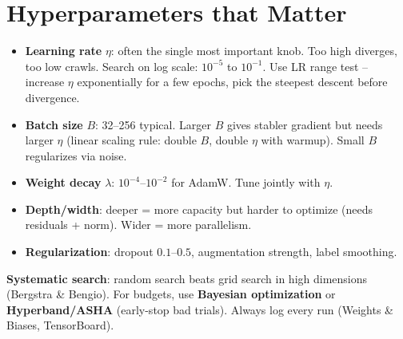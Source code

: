 \section{Hyperparameters that Matter}
\begin{itemize}
\item \textbf{Learning rate} $\eta$: often the single most important knob. Too high diverges, too low crawls. Search on log scale: $10^{-5}$ to $10^{-1}$. Use LR range test -- increase $\eta$ exponentially for a few epochs, pick the steepest descent before divergence.
\item \textbf{Batch size} $B$: 32--256 typical. Larger $B$ gives stabler gradient but needs larger $\eta$ (linear scaling rule: double $B$, double $\eta$ with warmup). Small $B$ regularizes via noise.
\item \textbf{Weight decay} $\lambda$: $10^{-4}$--$10^{-2}$ for AdamW. Tune jointly with $\eta$.
\item \textbf{Depth/width}: deeper = more capacity but harder to optimize (needs residuals + norm). Wider = more parallelism.
\item \textbf{Regularization}: dropout $0.1$--$0.5$, augmentation strength, label smoothing.
\end{itemize}

\begin{center}
\end{center}

\textbf{Systematic search}: random search beats grid search in high dimensions (Bergstra \& Bengio). For budgets, use \textbf{Bayesian optimization} or \textbf{Hyperband/ASHA} (early-stop bad trials). Always log every run (Weights \& Biases, TensorBoard).

